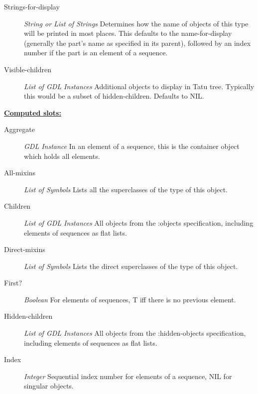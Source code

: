 \documentclass [11pt]{book}
\begin{document}
\begin{itemize}
\begin{description}
\item [Strings-for-display]
\emph{String or List of Strings} Determines how the name of objects of this type will be printed in most places.
This defaults to the name-for-display (generally the part's name as specified in its
parent), followed by an index number if the part is an element of a sequence.


\item [Visible-children]
\emph{List of GDL Instances} Additional objects to display in Tatu tree. Typically this would be a subset of hidden-children. Defaults to NIL.


\end{description}






\textbf{
\underline{Computed slots:}}

\begin{description}

\item [Aggregate]
\emph{GDL Instance} In an element of a sequence, this is the container object which holds all elements.


\item [All-mixins]
\emph{List of Symbols} Lists all the superclasses of the type of this object.


\item [Children]
\emph{List of GDL Instances} All objects from the :objects specification, including elements of sequences
as flat lists.


\item [Direct-mixins]
\emph{List of Symbols} Lists the direct superclasses of the type of this object.


\item [First?]
\emph{Boolean} For elements of sequences, T iff there is no previous element.


\item [Hidden-children]
\emph{List of GDL Instances} All objects from the :hidden-objects specification, including elements of sequences
as flat lists.


\item [Index]
\emph{Integer} Sequential index number for elements of a sequence, NIL for singular objects.



\end{description}
\end{itemize}
\end{document}
